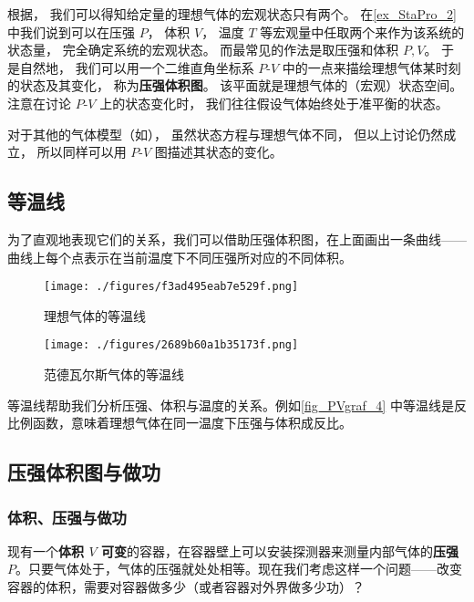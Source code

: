 
\begin{issues}
\issueDraft
\end{issues}


根据， 我们可以得知给定量的理想气体的宏观状态只有两个。 在\autoref{ex_StaPro_2}  中我们说到可以在压强 $P$， 体积 $V$， 温度 $T$ 等宏观量中任取两个来作为该系统的状态量， 完全确定系统的宏观状态。 而最常见的作法是取压强和体积 $P,V$。 于是自然地， 我们可以用一个二维直角坐标系 $P$-$V$ 中的一点来描绘理想气体某时刻的状态及其变化， 称为\textbf{压强体积图}。 该平面就是理想气体的（宏观）状态空间。 注意在讨论 $P$-$V$ 上的状态变化时， 我们往往假设气体始终处于准平衡的状态。

对于其他的气体模型（如）， 虽然状态方程与理想气体不同， 但以上讨论仍然成立， 所以同样可以用 $P$-$V$ 图描述其状态的变化。


\subsection{等温线}
为了直观地表现它们的关系，我们可以借助压强体积图，在上面画出一条曲线——曲线上每个点表示在当前温度下不同压强所对应的不同体积。
\begin{figure}[ht]
\centering
\texttt{[image: ./figures/f3ad495eab7e529f.png]}
\caption{理想气体的等温线} \label{fig_PVgraf_4}
\end{figure}
\begin{figure}[ht]
\centering
\texttt{[image: ./figures/2689b60a1b35173f.png]}
\caption{范德瓦尔斯气体的等温线} \label{fig_PVgraf_3}
\end{figure}

等温线帮助我们分析压强、体积与温度的关系。例如\autoref{fig_PVgraf_4} 中等温线是反比例函数，意味着理想气体在同一温度下压强与体积成反比。

\subsection{压强体积图与做功}

\subsubsection{体积、压强与做功}
现有一个\textbf{体积 $V$ 可变}的容器，在容器壁上可以安装探测器来测量内部气体的\textbf{压强 $P$}。只要气体处于，气体的压强就处处相等。现在我们考虑这样一个问题——改变容器的体积，需要对容器做多少（或者容器对外界做多少功）？

